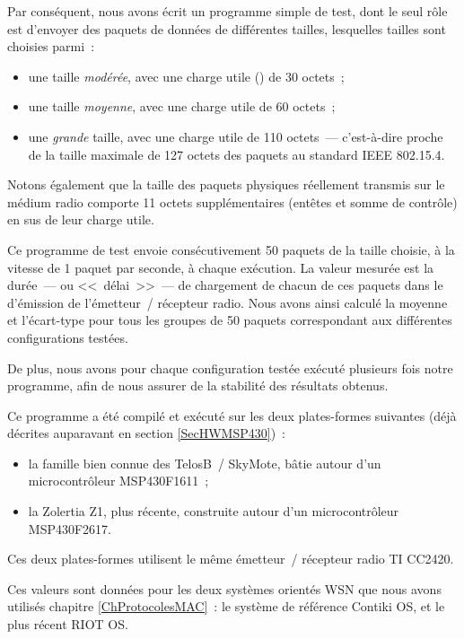 Par conséquent, nous avons écrit un programme simple de test, dont le seul
rôle est d'envoyer des paquets de données de différentes tailles,
lesquelles tailles sont choisies parmi~:
\begin{itemize}
\item une taille \emph{modérée}, avec une charge utile ()
de 30 octets~;
\item une taille \emph{moyenne}, avec une charge utile de 60 octets~;
\item une \emph{grande} taille, avec une charge utile de 110 octets~---
c'est-à-dire proche de la taille maximale de 127 octets des paquets au
standard IEEE 802.15.4.
\end{itemize}
Notons également que la taille des paquets physiques réellement transmis
sur le médium radio comporte 11 octets supplémentaires (entêtes et somme
de contrôle) en sus de leur charge utile.

Ce programme de test envoie consécutivement 50 paquets de la taille choisie,
à la vitesse de 1 paquet par seconde, à chaque exécution. La valeur mesurée
est la durée~--- ou <<~délai~>>~--- de chargement de chacun de ces
paquets dans le  d'émission de l'émetteur~/ récepteur radio.
Nous avons ainsi calculé la moyenne et l'écart-type pour tous les groupes
de 50 paquets correspondant aux différentes configurations testées. 

De plus, nous avons pour chaque configuration testée exécuté plusieurs
fois notre programme, afin de nous assurer de la stabilité des résultats
obtenus.

\medskip

Ce programme a été compilé et exécuté sur les deux plates-formes suivantes
(déjà décrites auparavant en section \vref{SecHWMSP430})~:
\begin{itemize}
\item la famille bien connue des  TelosB~/ SkyMote, bâtie
autour d'un microcontrôleur MSP430F1611~;
\item la  Zolertia Z1, plus récente, construite autour d'un
microcontrôleur MSP430F2617.
\end{itemize}
Ces deux plates-formes utilisent le même émetteur~/ récepteur radio
TI CC2420.

Ces valeurs sont données pour les deux systèmes orientés WSN que nous
avons utilisés chapitre \ref{ChProtocolesMAC}~: le système de référence
Contiki OS, et le plus récent RIOT OS.

